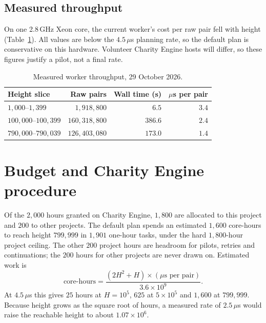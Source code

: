 \documentclass[11pt,a4paper]{article}
\begin{document}
\subsection{Measured throughput}
On one 2.8\,GHz Xeon core, the current worker's cost per raw pair fell with height
(Table~\ref{tab:speed}). All values are below the $4.5\,\mu$s planning rate, so the default
plan is conservative on this hardware. Volunteer Charity Engine hosts will differ, so these
figures justify a pilot, not a final rate.

\begin{table}[h]
\centering\small
\caption{Measured worker throughput, 29 October 2026.}\label{tab:speed}
\begin{tabular}{lrrr}
\toprule
Height slice & Raw pairs & Wall time (s) & $\mu$s per pair \\
\midrule
$1{,}000$--$1{,}399$ & $1{,}918{,}800$ & $6.5$ & $3.4$ \\
$100{,}000$--$100{,}399$ & $160{,}318{,}800$ & $386.6$ & $2.4$ \\
$790{,}000$--$790{,}039$ & $126{,}403{,}080$ & $173.0$ & $1.4$ \\
\bottomrule
\end{tabular}
\end{table}

\section{Budget and Charity Engine procedure}

Of the $2{,}000$ hours granted on Charity Engine, $1{,}800$ are allocated to this project and
$200$ to other projects. The default plan spends an estimated $1{,}600$ core-hours to reach
height $799{,}999$ in $1{,}901$ one-hour tasks, under the hard $1{,}800$-hour project ceiling.
The other $200$ project hours are headroom for pilots, retries and continuations; the $200$
hours for other projects are never drawn on. Estimated work is
\begin{equation}
  \text{core-hours}=\frac{(2H^2+H)\times(\mu\text{s per pair})}{3.6\times10^{9}}.
\end{equation}
At $4.5\,\mu$s this gives $25$ hours at $H=10^5$, $625$ at $5\times10^5$ and $1{,}600$ at
$799{,}999$. Because height grows as the square root of hours, a measured rate of
$2.5\,\mu$s would raise the reachable height to about $1.07\times10^6$.
\end{document}
